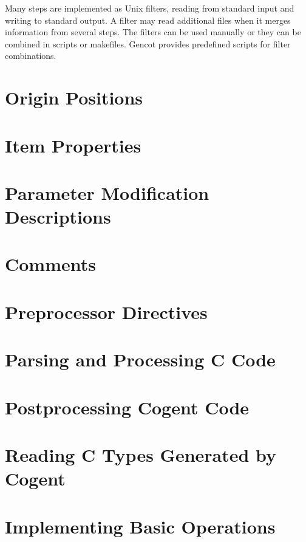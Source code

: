 \documentclass[a4paper]{report}
\begin{document}
Many steps are implemented as Unix filters, reading from standard input and writing to standard output. A filter
may read additional files when it merges information from several steps. The filters
can be used manually or they can be combined in scripts or makefiles. Gencot provides predefined scripts
for filter combinations.

\section{Origin Positions}
\label{impl-origin}


\section{Item Properties}
\label{impl-itemprops}


\section{Parameter Modification Descriptions}
\label{impl-parmod}


\section{Comments}
\label{impl-comments}


\section{Preprocessor Directives}
\label{impl-preprocessor}


\section{Parsing and Processing C Code}
\label{impl-ccode}


\section{Postprocessing Cogent Code}
\label{impl-post}


\section{Reading C Types Generated by Cogent}
\label{impl-ctypinfo}


\section{Implementing Basic Operations}
\label{impl-operations}

\end{document}
